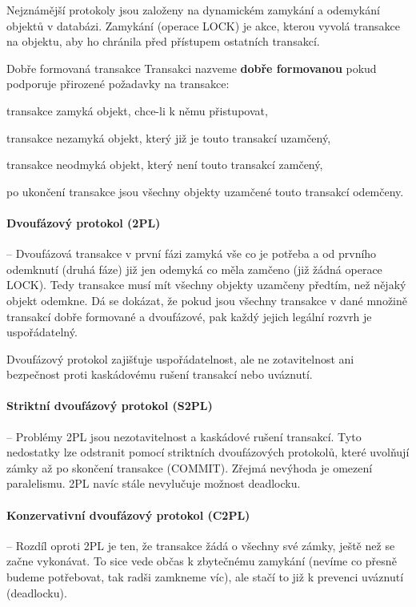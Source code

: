 Nejznámější protokoly jsou založeny na dynamickém zamykání a odemykání objektů v
databázi. Zamykání (operace LOCK) je akce, kterou vyvolá transakce na objektu,
aby ho chránila před přístupem ostatních transakcí.

\begin{definiceN}{Dobře formovaná transakce}
Transakci nazveme \textbf{dobře formovanou} pokud podporuje přirozené požadavky
na transakce:
\begin{penumerate}
  \item transakce zamyká objekt, chce-li k němu přistupovat,
  \item transakce nezamyká objekt, který již je touto transakcí uzamčený,
  \item transakce neodmyká objekt, který není touto transakcí zamčený,
  \item po ukončení transakce jsou všechny objekty uzamčené touto transakcí
  odemčeny.
\end{penumerate}
\end{definiceN}

\paragraph{Dvoufázový protokol (2PL)} -- Dvoufázová transakce v první fázi
zamyká vše co je potřeba a od prvního odemknutí (druhá fáze) již jen odemyká co
měla zamčeno (již žádná operace LOCK). Tedy transakce musí mít všechny objekty
uzamčeny předtím, než nějaký objekt odemkne. Dá se dokázat, že pokud jsou
všechny transakce v dané množině transakcí dobře formované a dvoufázové, pak
každý jejich legální rozvrh je uspořádatelný.

Dvoufázový protokol zajišťuje uspořádatelnost, ale ne zotavitelnost ani
bezpečnost proti kaskádovému rušení transakcí nebo uváznutí.

\paragraph{Striktní dvoufázový protokol (S2PL)} -- Problémy 2PL jsou nezotavitelnost
a kaskádové rušení transakcí. Tyto nedostatky lze odstranit pomocí striktních
dvoufázových protokolů, které uvolňují zámky až po skončení transakce (COMMIT).
Zřejmá nevýhoda je omezení paralelismu. 2PL navíc stále nevylučuje možnost deadlocku.

\paragraph{Konzervativní dvoufázový protokol (C2PL)} -- Rozdíl oproti 2PL je
ten, že transakce žádá o všechny své zámky, ještě než se začne
vykonávat. To sice vede občas k zbytečnému zamykání (nevíme co přesně budeme
potřebovat, tak radši zamkneme víc), ale stačí to již k prevenci uváznutí
(deadlocku).

